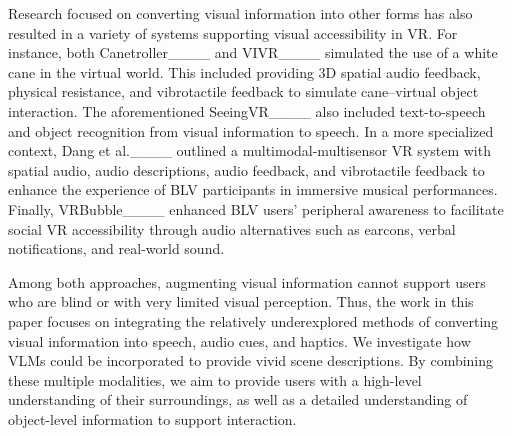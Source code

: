 Research focused on converting visual information into other forms has also resulted in a variety of systems supporting visual accessibility in VR. For instance, both Canetroller____ and VIVR____ simulated the use of a white cane in the virtual world. This included providing 3D spatial audio feedback, physical resistance, and vibrotactile feedback to simulate cane--virtual object interaction. The aforementioned SeeingVR____ also included text-to-speech and object recognition from visual information to speech. In a more specialized context, Dang et al.____ outlined a multimodal-multisensor VR system with spatial audio, audio descriptions, audio feedback, and vibrotactile feedback to enhance the experience of BLV participants in immersive musical performances. 
Finally, VRBubble____ enhanced BLV users' peripheral awareness to facilitate social VR accessibility through audio alternatives such as earcons, verbal notifications, and real-world sound.



Among both approaches, augmenting visual information cannot support users who are blind or with very limited visual perception. Thus, the work in this paper focuses on integrating the relatively underexplored methods of converting visual information into speech, audio cues, and haptics. We investigate how VLMs could be incorporated to provide vivid scene descriptions. By combining these multiple modalities, we aim to provide users with a high-level understanding of their surroundings, as well as a detailed understanding of object-level information to support interaction.

